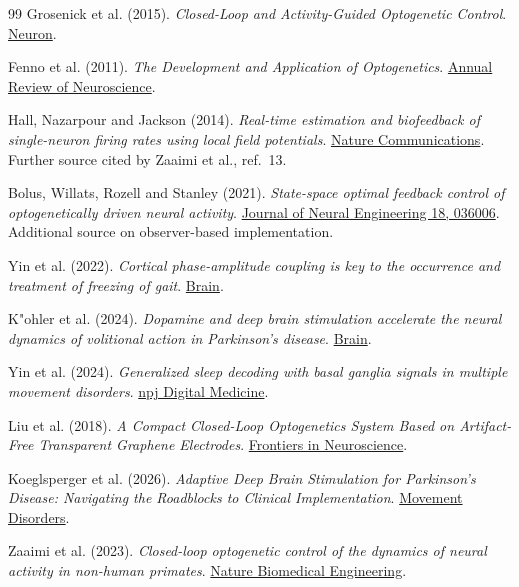 ﻿\documentclass[11pt,a4paper]{article}
\begin{document}
\newpage
\begingroup
\small
\begin{thebibliography}{99}
\setlength{\itemsep}{0.2em}
Grosenick et al. (2015).
\emph{Closed-Loop and Activity-Guided Optogenetic Control}.
\href{https://doi.org/10.1016/j.neuron.2015.03.034}{Neuron}.

Fenno et al. (2011).
\emph{The Development and Application of Optogenetics}.
\href{https://doi.org/10.1146/annurev-neuro-061010-113817}{Annual Review of Neuroscience}.

Hall, Nazarpour and Jackson (2014).
\emph{Real-time estimation and biofeedback of single-neuron firing rates
using local field potentials}.
\href{https://doi.org/10.1038/ncomms6462}{Nature Communications}.
Further source cited by Zaaimi et al., ref.~13.

Bolus, Willats, Rozell and Stanley (2021).
\emph{State-space optimal feedback control of optogenetically driven
neural activity}.
\href{https://doi.org/10.1088/1741-2552/abb89c}{Journal of Neural Engineering 18, 036006}.
Additional source on observer-based implementation.

Yin et al. (2022).
\emph{Cortical phase-amplitude coupling is key to the occurrence and
treatment of freezing of gait}.
\href{https://doi.org/10.1093/brain/awac121}{Brain}.

K{"o}hler et al. (2024).
\emph{Dopamine and deep brain stimulation accelerate the neural dynamics
of volitional action in Parkinson's disease}.
\href{https://doi.org/10.1093/brain/awae219}{Brain}.

Yin et al. (2024).
\emph{Generalized sleep decoding with basal ganglia signals in multiple
movement disorders}.
\href{https://doi.org/10.1038/s41746-024-01115-7}{npj Digital Medicine}.

Liu et al. (2018).
\emph{A Compact Closed-Loop Optogenetics System Based on Artifact-Free
Transparent Graphene Electrodes}.
\href{https://doi.org/10.3389/fnins.2018.00132}{Frontiers in Neuroscience}.

Koeglsperger et al. (2026).
\emph{Adaptive Deep Brain Stimulation for Parkinson's Disease:
Navigating the Roadblocks to Clinical Implementation}.
\href{https://doi.org/10.1002/mds.70284}{Movement Disorders}.

Zaaimi et al. (2023).
\emph{Closed-loop optogenetic control of the dynamics of neural activity
in non-human primates}.
\href{https://doi.org/10.1038/s41551-022-00945-8}{Nature Biomedical Engineering}.


\end{thebibliography}
\end{document}
